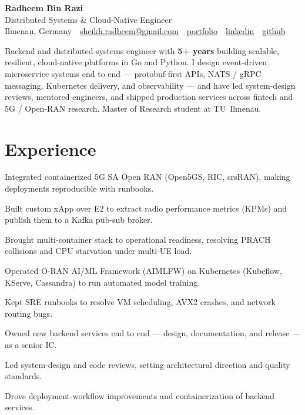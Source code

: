 \documentclass[11pt,a4paper]{resume}
\makeatletter
\newcommand{\Portfolio}{https://radheem.github.io/my-cv}
\newcommand{\PortfolioText}{portfolio}
\newcommand{\GitHub}{https://github.com/radheem}
\newcommand{\GitHubText}{github}
\newcommand{\LinkedIn}{https://www.linkedin.com/in/radheem-razi}
\newcommand{\LinkedInText}{linkedin}
\newcommand{\Email}{sheikh.radheem@gmail.com}
\makeatother
\begin{document}
\begin{center}
  {\huge\bfseries Radheem Bin Razi}\\[3pt]
  {\large Distributed Systems \& Cloud-Native Engineer}\\[6pt]
  \small
  Ilmenau, Germany \,\textbar\,
  \href{mailto:\Email}{\Email} \,\textbar\,
  \href{\Portfolio}{\PortfolioText} \,\textbar\,
  \href{\LinkedIn}{\LinkedInText} \,\textbar\,
  \href{\GitHub}{\GitHubText}
\end{center}
\vspace{2pt}

\noindent
Backend and distributed-systems engineer with \textbf{5+ years} building scalable, resilient,
cloud-native platforms in Go and Python. I design event-driven microservice systems end to
end — protobuf-first APIs, NATS / gRPC messaging, Kubernetes delivery, and observability — and
have led system-design reviews, mentored engineers, and shipped production services across
fintech and 5G / Open-RAN research. Master of Research student at TU~Ilmenau.

\section{Experience}

\bullets
  \item Integrated containerized 5G SA Open RAN (Open5GS, RIC, srsRAN), making deployments reproducible with runbooks.
  \item Built custom xApp over E2 to extract radio performance metrics (KPMs) and publish them to a Kafka pub-sub broker.
  \item Brought multi-container stack to operational readiness, resolving PRACH collisions and CPU starvation under multi-UE load.
  \item Operated O-RAN AI/ML Framework (AIMLFW) on Kubernetes (Kubeflow, KServe, Cassandra) to run automated model training.
  \item Kept SRE runbooks to resolve VM scheduling, AVX2 crashes, and network routing bugs.
\bulletsend
\vspace{3pt}

\bullets
  \item Owned new backend services end to end — design, documentation, and release — as a senior IC.
  \item Led system-design and code reviews, setting architectural direction and quality standards.
  \item Drove deployment-workflow improvements and containerization of backend services.
\bulletsend
\vspace{3pt}
\end{document}
